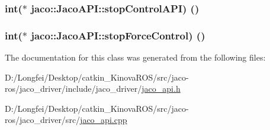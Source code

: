 \subsubsection[{\texorpdfstring{stop\+Control\+A\+PI}{stopControlAPI}}]{\setlength{\rightskip}{0pt plus 5cm}int($\ast$ jaco\+::\+Jaco\+A\+P\+I\+::stop\+Control\+A\+PI) ()}\hypertarget{classjaco_1_1JacoAPI_a41fefb13b76fc591cde461d1a9b91bb2}{}\label{classjaco_1_1JacoAPI_a41fefb13b76fc591cde461d1a9b91bb2}
\subsubsection[{\texorpdfstring{stop\+Force\+Control}{stopForceControl}}]{\setlength{\rightskip}{0pt plus 5cm}int($\ast$ jaco\+::\+Jaco\+A\+P\+I\+::stop\+Force\+Control) ()}\hypertarget{classjaco_1_1JacoAPI_ac3881ef354400b32a4d71796dba66d67}{}\label{classjaco_1_1JacoAPI_ac3881ef354400b32a4d71796dba66d67}


The documentation for this class was generated from the following files\+:\begin{DoxyCompactItemize}
\item 
D\+:/\+Longfei/\+Desktop/catkin\+\_\+\+Kinova\+R\+O\+S/src/jaco-\/ros/jaco\+\_\+driver/include/jaco\+\_\+driver/\hyperlink{jaco__api_8h}{jaco\+\_\+api.\+h}\item 
D\+:/\+Longfei/\+Desktop/catkin\+\_\+\+Kinova\+R\+O\+S/src/jaco-\/ros/jaco\+\_\+driver/src/\hyperlink{jaco__api_8cpp}{jaco\+\_\+api.\+cpp}\end{DoxyCompactItemize}
